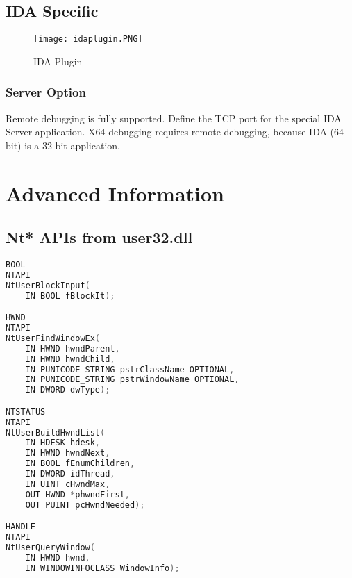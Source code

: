 \documentclass[10pt,a4paper]{article}
\begin{document}
\subsection{IDA Specific}

\begin{figure}[H]
\centering
\texttt{[image: idaplugin.PNG]}
\caption{IDA Plugin}
\end{figure}

\subsubsection{Server Option}
Remote debugging is fully supported. Define the TCP port for the special IDA Server application. X64 debugging requires remote debugging, because IDA (64-bit) is a 32-bit application.


\pagebreak

\section{Advanced Information}
\subsection{Nt* APIs from user32.dll}

\begin{lstlisting}[language=C, caption=Special Nt* APIs declaration]
BOOL
NTAPI
NtUserBlockInput(
    IN BOOL fBlockIt);

HWND
NTAPI
NtUserFindWindowEx(
    IN HWND hwndParent,
    IN HWND hwndChild,
    IN PUNICODE_STRING pstrClassName OPTIONAL,
    IN PUNICODE_STRING pstrWindowName OPTIONAL,
    IN DWORD dwType);

NTSTATUS
NTAPI
NtUserBuildHwndList(
    IN HDESK hdesk,
    IN HWND hwndNext,
    IN BOOL fEnumChildren,
    IN DWORD idThread,
    IN UINT cHwndMax,
    OUT HWND *phwndFirst,
    OUT PUINT pcHwndNeeded);

HANDLE
NTAPI
NtUserQueryWindow(
    IN HWND hwnd,
    IN WINDOWINFOCLASS WindowInfo);
\end{lstlisting}
\end{document}
